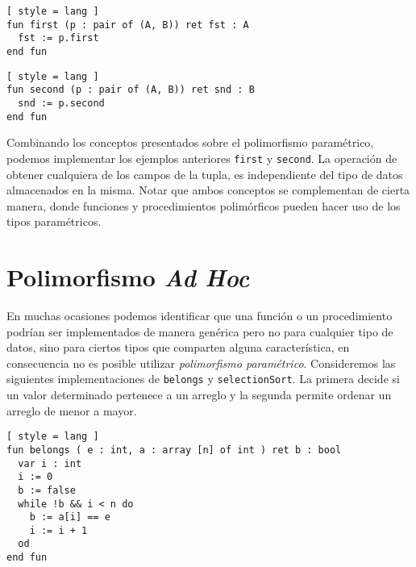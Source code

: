 \begin{lstlisting}[ style = lang ]
fun first (p : pair of (A, B)) ret fst : A
  fst := p.first
end fun
\end{lstlisting}

\begin{lstlisting}[ style = lang ]
fun second (p : pair of (A, B)) ret snd : B
  snd := p.second
end fun
\end{lstlisting}

Combinando los conceptos presentados sobre el polimorfismo paramétrico, podemos implementar los ejemplos anteriores \lstinline[style = lang]{first} y \lstinline[style = lang]{second}.
La operación de obtener cualquiera de los campos de la tupla, es independiente del tipo de datos almacenados en la misma.
Notar que ambos conceptos se complementan de cierta manera, donde funciones y procedimientos polimórficos pueden hacer uso de los tipos paramétricos.




\section{Polimorfismo \textit{Ad Hoc}}

En muchas ocasiones podemos identificar que una función o un procedimiento podrían ser implementados de manera genérica pero no para cualquier tipo de datos, sino para ciertos tipos que comparten alguna característica, en consecuencia no es posible utilizar \textit{polimorfismo paramétrico}.
Consideremos las siguientes implementaciones de \lstinline[style = lang]{belongs} y \lstinline[style = lang]{selectionSort}.
La primera decide si un valor determinado pertenece a un arreglo y la segunda permite ordenar un arreglo de menor a mayor.

\begin{lstlisting}[ style = lang ]
fun belongs ( e : int, a : array [n] of int ) ret b : bool
  var i : int
  i := 0
  b := false
  while !b && i < n do
    b := a[i] == e
    i := i + 1
  od
end fun
\end{lstlisting}

